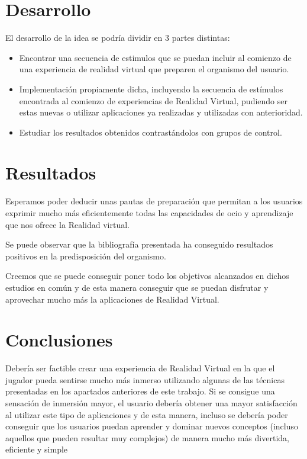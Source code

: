\documentclass[twoside,twocolumn]{article}
\begin{document}
\section{Desarrollo}
El desarrollo de la idea se podría dividir en 3 partes distintas:

\begin{itemize}
\item Encontrar una secuencia de estimulos que se puedan incluir al comienzo de una experiencia de realidad virtual que preparen el organismo del usuario.
\item Implementación propiamente dicha, incluyendo la secuencia de estímulos encontrada al comienzo de experiencias de Realidad Virtual, pudiendo ser estas nuevas o utilizar aplicaciones ya realizadas y utilizadas con anterioridad.
\item Estudiar los resultados obtenidos contrastándolos con grupos de control.
\end{itemize}

\section{Resultados}
Esperamos poder deducir unas pautas de preparación que permitan a los usuarios exprimir mucho más eficientemente todas las capacidades de ocio y aprendizaje que nos ofrece la Realidad virtual.

Se puede observar que la bibliografía presentada ha conseguido resultados positivos en la predisposición del organismo.

Creemos que se puede conseguir poner todo los objetivos alcanzados en dichos estudios en común y de esta manera conseguir que se puedan disfrutar y aprovechar mucho más la aplicaciones de Realidad Virtual.

\section{Conclusiones}
Debería ser factible crear una experiencia de Realidad Virtual en la que el jugador pueda sentirse mucho más inmerso utilizando algunas de las técnicas presentadas en los apartados anteriores de este trabajo. Si se consigue una sensación de inmersión mayor, el usuario debería obtener una mayor satisfacción al utilizar este tipo de aplicaciones y de esta manera, incluso se debería poder conseguir que los usuarios puedan aprender y dominar nuevos conceptos (incluso aquellos que pueden resultar muy complejos) de manera mucho más divertida, eficiente y simple

\medskip
\nocite{*}
\printbibliography
\end{document}
